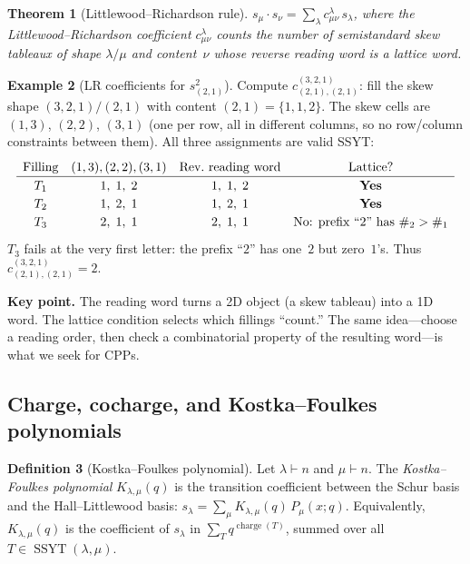 \documentclass[11pt]{article}
\theoremstyle{plain}
\newtheorem{theorem}{Theorem}[section]
\theoremstyle{definition}
\newtheorem{definition}[theorem]{Definition}
\newtheorem{example}[theorem]{Example}
\theoremstyle{remark}
\newcommand{\charge}{\operatorname{charge}}
\newcommand{\SSYT}{\operatorname{SSYT}}
\begin{document}
\begin{theorem}[Littlewood--Richardson rule]\label{thm:LR}
$s_\mu \cdot s_\nu = \sum_\lambda c^{\lambda}_{\mu\nu}\, s_\lambda$,
where the \emph{Littlewood--Richardson coefficient}
$c^{\lambda}_{\mu\nu}$ counts the number of semistandard
skew tableaux of shape $\lambda / \mu$ and content~$\nu$
whose reverse reading word is a lattice word.
\end{theorem}

\begin{example}[LR coefficients for $s_{(2,1)}^2$]
\label{ex:LR}
Compute $c^{(3,2,1)}_{(2,1),(2,1)}$: fill the skew shape
$(3,2,1)/(2,1)$ with content $(2,1) = \{1,1,2\}$.  The skew
cells are $(1,3)$, $(2,2)$, $(3,1)$ (one per row, all in
different columns, so no row/column constraints between them).
All three assignments are valid SSYT:
\[
\renewcommand{\arraystretch}{1.2}
\begin{array}{cccc}
  \text{Filling} & (1,3),(2,2),(3,1) & \text{Rev.\ reading word} & \text{Lattice?} \\
  \hline
  T_1 & 1,\; 1,\; 2 & 1,\;1,\;2 & \text{\textbf{Yes}} \\
  T_2 & 1,\; 2,\; 1 & 1,\;2,\;1 & \text{\textbf{Yes}} \\
  T_3 & 2,\; 1,\; 1 & 2,\;1,\;1 & \text{No: prefix ``$2$'' has $\#_2 > \#_1$}
\end{array}
\]
$T_3$ fails at the very first letter: the prefix ``$2$''
has one~$2$ but zero~$1$'s.  Thus
$c^{(3,2,1)}_{(2,1),(2,1)} = 2$.

\smallskip\noindent
\textbf{Key point.}  The reading word turns a 2D object
(a skew tableau) into a 1D word.  The lattice condition
selects which fillings ``count.''  The same idea---choose
a reading order, then check a combinatorial property of
the resulting word---is what we seek for CPPs.
\end{example}

\subsection{Charge, cocharge, and Kostka--Foulkes polynomials}

\begin{definition}[Kostka--Foulkes polynomial]\label{def:KF}
Let $\lambda \vdash n$ and $\mu \vdash n$.
The \emph{Kostka--Foulkes polynomial} $K_{\lambda,\mu}(q)$ is the
transition coefficient between the Schur basis and the
Hall--Littlewood basis:
$s_\lambda = \sum_\mu K_{\lambda,\mu}(q)\, P_\mu(x;q)$.
Equivalently, $K_{\lambda,\mu}(q)$ is the coefficient of
$s_\lambda$ in $\sum_T q^{\charge(T)}$, summed over all
$T \in \SSYT(\lambda, \mu)$.
\end{definition}
\end{document}
